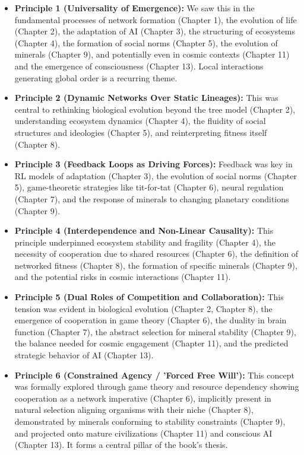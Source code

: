 \documentclass[12pt,openany]{book}
\begin{document}
\begin{itemize}
    \item \textbf{Principle 1 (Universality of Emergence):} We saw this in the fundamental processes of network formation (Chapter 1), the evolution of life (Chapter 2), the adaptation of AI (Chapter 3), the structuring of ecosystems (Chapter 4), the formation of social norms (Chapter 5), the evolution of minerals (Chapter 9), and potentially even in cosmic contexts (Chapter 11) and the emergence of consciousness (Chapter 13). Local interactions generating global order is a recurring theme.

    \item \textbf{Principle 2 (Dynamic Networks Over Static Lineages):} This was central to rethinking biological evolution beyond the tree model (Chapter 2), understanding ecosystem dynamics (Chapter 4), the fluidity of social structures and ideologies (Chapter 5), and reinterpreting fitness itself (Chapter 8).

    \item \textbf{Principle 3 (Feedback Loops as Driving Forces):} Feedback was key in RL models of adaptation (Chapter 3), the evolution of social norms (Chapter 5), game-theoretic strategies like tit-for-tat (Chapter 6), neural regulation (Chapter 7), and the response of minerals to changing planetary conditions (Chapter 9).

    \item \textbf{Principle 4 (Interdependence and Non-Linear Causality):} This principle underpinned ecosystem stability and fragility (Chapter 4), the necessity of cooperation due to shared resources (Chapter 6), the definition of networked fitness (Chapter 8), the formation of specific minerals (Chapter 9), and the potential risks in cosmic interactions (Chapter 11).

    \item \textbf{Principle 5 (Dual Roles of Competition and Collaboration):} This tension was evident in biological evolution (Chapter 2, Chapter 8), the emergence of cooperation in game theory (Chapter 6), the duality in brain function (Chapter 7), the abstract selection for mineral stability (Chapter 9), the balance needed for cosmic engagement (Chapter 11), and the predicted strategic behavior of AI (Chapter 13).

    \item \textbf{Principle 6 (Constrained Agency / 'Forced Free Will'):} This concept was formally explored through game theory and resource dependency showing cooperation as a network imperative (Chapter 6), implicitly present in natural selection aligning organisms with their niche (Chapter 8), demonstrated by minerals conforming to stability constraints (Chapter 9), and projected onto mature civilizations (Chapter 11) and conscious AI (Chapter 13). It forms a central pillar of the book's thesis.


\end{itemize}
\end{document}
